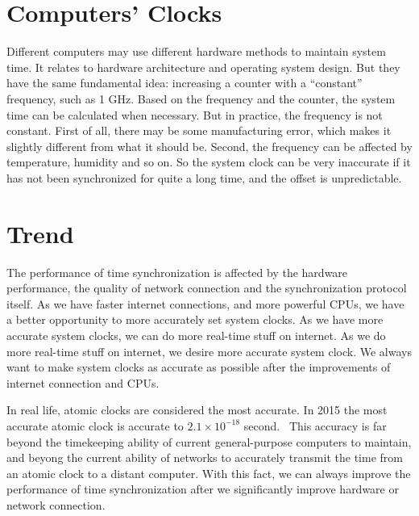 \section{Computers' Clocks}
\label{sec:computers_clocks}
Different computers may use different hardware methods to maintain system time.
It relates to hardware architecture and operating system design. But they have
the same fundamental idea: increasing a counter with a ``constant'' frequency,
such as 1 GHz.
Based on the frequency and the counter, the system time can be calculated
when necessary. But in practice, the frequency is not constant. First of all,
there may be some manufacturing error, which makes it slightly different from
what it should be. Second, the frequency can be affected by temperature,
humidity and so on. So the system clock can be very inaccurate if it has not
been synchronized for quite a long time, and the offset is unpredictable.

\section{Trend}
\label{sec:trend}
The performance of time synchronization is affected by the hardware
performance, the quality of network connection and the synchronization protocol
itself. 
As we have faster internet connections, and more powerful CPUs, we have a
better opportunity to more accurately set system clocks. As we have more
accurate system clocks, we can do more real-time stuff on internet. As we do
more real-time stuff on internet, we desire more accurate system clock. We
always want to make system clocks as accurate as possible after the
improvements of internet connection and CPUs. 

In real life, atomic clocks are considered the most accurate. In 2015 the most
accurate atomic clock is accurate to $2.1\times 10^{-18}$
second.~\cite{atomic_clock} 
This accuracy is far beyond the timekeeping ability of current general-purpose
computers to maintain, and beyong the current ability of networks to accurately
transmit the time from an atomic clock to a distant computer. With this fact,
we can always improve the performance of time synchronization after we
significantly improve hardware or network connection.
